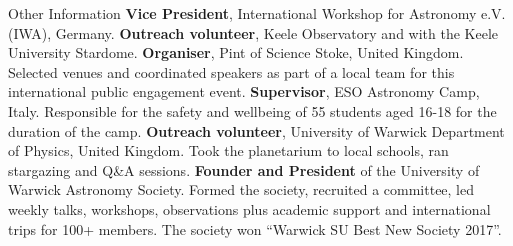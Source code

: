 \begin{rubric}{Other Information}
%
    \textbf{Vice President}, International Workshop for Astronomy e.V. (IWA), Germany.
%
    \textbf{Outreach volunteer}, Keele Observatory and with the Keele University Stardome. 
\entry*[2019 -- 2020]%
    \textbf{Organiser}, Pint of Science Stoke, United Kingdom. Selected venues and coordinated speakers as part of a local team for this international public engagement event.
\entry*[2017 -- 2019]%
    \textbf{Supervisor}, ESO Astronomy Camp, Italy. Responsible for the safety and wellbeing of 55 students aged 16-18 for the duration of the camp.%
\entry*[2017 -- 2018]%
    \textbf{Outreach volunteer}, University of Warwick Department of Physics, United Kingdom. Took the planetarium to local schools, ran stargazing and Q\&A sessions.
\entry*[2016 -- 2018]%
    \textbf{Founder and President} of the University of Warwick Astronomy Society. Formed the society, recruited a committee, led weekly talks, workshops, observations plus academic support and international trips for 100+ members. The society won “Warwick SU Best New Society 2017”.
\end{rubric}